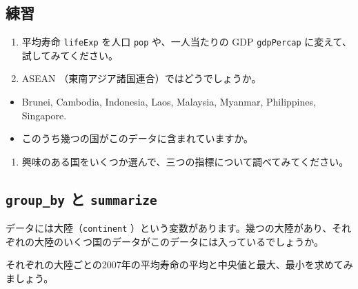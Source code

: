 \documentclass[
  xelatex, ja=standard]{bxjsbook}
\providecommand{\tightlist}{%
  \setlength{\itemsep}{0pt}\setlength{\parskip}{0pt}}
\theoremstyle{definition}
\theoremstyle{definition}
\theoremstyle{definition}
\theoremstyle{definition}
\theoremstyle{remark}
\begin{document}
\hypertarget{ux7df4ux7fd2-3}{%
\subsection{練習}\label{ux7df4ux7fd2-3}}

\begin{enumerate}
\def\labelenumi{\arabic{enumi}.}
\tightlist
\item
  平均寿命 \texttt{lifeExp} を人口 \texttt{pop} や、一人当たりの GDP \texttt{gdpPercap} に変えて、試してみてください。
\item
  ASEAN （東南アジア諸国連合）ではどうでしょうか。
\end{enumerate}

\begin{itemize}
\item
  Brunei, Cambodia, Indonesia, Laos, Malaysia, Myanmar, Philippines, Singapore.
\item
  このうち幾つの国がこのデータに含まれていますか。
\end{itemize}

\begin{enumerate}
\def\labelenumi{\arabic{enumi}.}
\setcounter{enumi}{2}
\tightlist
\item
  興味のある国をいくつか選んで、三つの指標について調べてみてください。
\end{enumerate}

\hypertarget{group_by-ux3068-summarize}{%
\subsection{\texorpdfstring{\texttt{group\_by} と \texttt{summarize}}{group\_by と summarize}}\label{group_by-ux3068-summarize}}

データには大陸（\texttt{continent} ）という変数があります。幾つの大陸があり、それぞれの大陸のいくつ国のデータがこのデータには入っているでしょうか。

それぞれの大陸ごとの2007年の平均寿命の平均と中央値と最大、最小を求めてみましょう。
\end{document}
